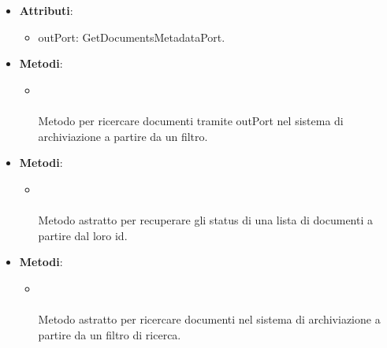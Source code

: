 \documentclass[10pt, a4paper]{article}
\begin{document}
\label{GetDocumentsMetadataDettaglio}
\begin{itemize}
    \item \textbf{Attributi}:
    \begin{itemize}
        \item outPort: GetDocumentsMetadataPort.
    \end{itemize}
    \item \textbf{Metodi}:
    \begin{itemize}
        \item {}\\ \\
        Metodo per ricercare documenti tramite outPort nel sistema di archiviazione a partire da un filtro.
    \end{itemize}
\end{itemize}

\label{GetDocumentsStatusPortDettaglio}
\begin{itemize}
    \item \textbf{Metodi}:
    \begin{itemize}
        \item {}\\ \\
        Metodo astratto per recuperare gli status di una lista di documenti a partire dal loro id.
    \end{itemize}
\end{itemize}

\label{GetDocumentsMetadataPortDettaglio}
\begin{itemize}
    \item \textbf{Metodi}:
    \begin{itemize}
        \item {}\\ \\
        Metodo astratto per ricercare documenti nel sistema di archiviazione a partire da un filtro di ricerca.
    \end{itemize}
\end{itemize}
\end{document}
